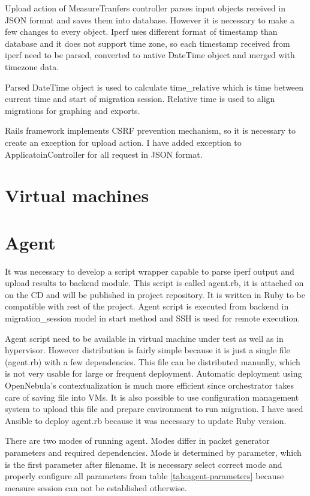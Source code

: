 Upload action of MeasureTranfers controller parses input objects received in \Ac{JSON} format and saves them into database. However it is necessary to make a few changes to every object. Iperf uses different format of timestamp than database and it does not support time zone, so each timestamp received from iperf need to be parsed, converted to native DateTime object and merged with timezone data. 

Parsed DateTime object is used to calculate time\_relative which is time between current time and start of migration session. Relative time is used to align migrations for graphing and exports.

Rails framework implements \Ac{CSRF} prevention mechanism, so it is necessary to create an exception for upload action. I have added exception to ApplicatoinController for all request in \Ac{JSON} format.


\section{Virtual machines}


\cleardoublepage

\section{Agent}
It was necessary to develop a script wrapper capable to parse iperf output and upload results to backend module. This script is called agent.rb, it is attached on on the CD and will be published in project repository. It is written in Ruby to be compatible with rest of the project. Agent script is executed from backend in migration\_session model in start method and \Ac{SSH} is used for remote execution.

Agent script need to be available in virtual machine under test as well as in hypervisor. However distribution is fairly simple because it is just a single file (agent.rb) with a few dependencies. This file can be distributed manually, which is not very usable for large or frequent deployment. Automatic deployment using OpenNebula's contextualization is much more efficient since orchestrator takes care of saving file into \Ac{VM}s. 
It is also possible to use configuration management system to upload this file and prepare environment to run migration. I have used Ansible to deploy agent.rb because it was necessary to update Ruby version. 

There are two modes of running agent. Modes differ in packet generator parameters and required dependencies. Mode is determined by  parameter, which is the first parameter after filename. It is necessary select correct mode and properly configure all parameters from table \ref{tab:agent-parameters} because measure session can not be established otherwise. 

